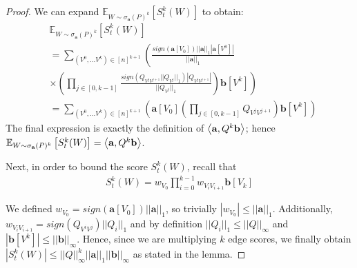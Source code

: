 \begin{proof}
We can expand $\mathbb{E}_{W \sim \sigma_{\mathbf{a}}(P)^k} \left[S_{t}^k(W)\right]$ to obtain:
\small
\begin{align*}
&\mathbb{E}_{W \sim \sigma_{\mathbf{a}}(P)^k} \left[S_{t}^k(W)\right] \\ 
&= \sum_{(V^0, ... V^{k}) \in [n]^{k+1}} \left(\frac{sign(\mathbf{a}[V_0])||\mathbf{a}||_1|\mathbf{a}[V^0]|}{||\mathbf{a}||_1} \right. \\
&\left. \times \left( \prod_{j \in [0, k-1]} \frac{sign(Q_{V^jV^{j+1}}||Q_{V^j}||_1)|Q_{V^jV^{j+1}}|}{||Q_{V^j}||_1} \right) \mathbf{b}[V^k] \right) \\
& = \sum_{(V^0, ... V^{k}) \in [n]^{k+1}} \left(\mathbf{a}[V_0] \left( \prod_{j \in [0, k-1]} Q_{V^jV^{j+1}}\right) \mathbf{b}[V^k] \right)
\end{align*}
\normalsize
The final expression is exactly the definition of $\left< \mathbf{a}, Q^k\mathbf{b} \right>$; hence $\mathbb{E}_{W \sim \sigma_{\mathbf{a}}(P)^k} \left[S_{t}^k(W)\right] = \left< \mathbf{a}, Q^k\mathbf{b} \right>$.


Next, in order to bound the score $S_{t}^k(W)$, recall that
\begin{align*}
S_{t}^k(W) = w_{V_0}\prod_{i=0}^{k-1}w_{V_iV_{i+1}}\mathbf{b}[V_{k}]
\end{align*}

We defined $w_{V_0} = sign(\mathbf{a}[V_0])||\mathbf{a}||_1$, so trivially $|w_{V_0}| \leq ||\mathbf{a}||_1$.
Additionally, $w_{V_iV_{i+1}} = sign(Q_{V^iV^j})||Q_i||_1 $ and by definition $||Q_i||_1  \leq ||Q||_{\infty}$ and $| \mathbf{b}[V^k] |\leq ||\mathbf{b}||_\infty$.
Hence, since we are multiplying $k$ edge scores, we finally obtain
$|S_{t}^k(W)| \leq ||Q||_{\infty}^k||\mathbf{a}||_1||\mathbf{b}||_\infty$ as stated in the lemma.
\end{proof}

